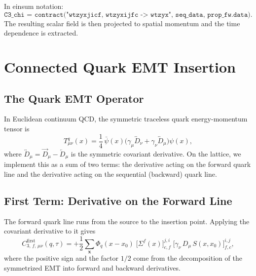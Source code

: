 \documentclass[11pt,a4paper]{article}
\newcommand{\Dmu}{D_{\mu}}
\newcommand{\TmunuQ}{T_{\mu\nu}^{q}}
\newcommand{\seqprop}{\Sigma}
\newcommand{\fwprop}{S}
\newcommand{\xsrc}{x_{0}}
\newcommand{\xins}{x}
\newcommand{\momtrans}{q}
\begin{document}
In einsum notation:
\begin{equation}
  \texttt{C3\_chi = contract("wtzyxjicf, wtzyxijfc -> wtzyx", seq\_data, prop\_fw.data)}.
\end{equation}
The resulting scalar field is then projected to spatial momentum and the time
dependence is extracted.

\section{Connected Quark EMT Insertion}

\subsection{The Quark EMT Operator}

In Euclidean continuum QCD, the symmetric traceless quark energy-momentum tensor is
\begin{equation}
  \TmunuQ(x) = \frac{1}{4}\,
    \bar{\psi}(x)\Big(
      \gamma_{\mu}\overleftrightarrow{D}_{\nu}
      + \gamma_{\nu}\overleftrightarrow{D}_{\mu}
    \Big)\psi(x),
\end{equation}
where $\overleftrightarrow{D}_{\mu} = \overrightarrow{D}_{\mu} -
\overleftarrow{D}_{\mu}$ is the symmetric covariant derivative.  On the lattice, we
implement this as a sum of two terms: the derivative acting on the forward quark
line and the derivative acting on the sequential (backward) quark line.

\subsection{First Term: Derivative on the Forward Line}

The forward quark line runs from the source to the insertion point.  Applying the
covariant derivative to it gives
\begin{equation}
  \boxed{
  C_{3,\,f,\,\mu\nu}^{\text{first}}(\momtrans,\tau)
  = +\frac{1}{2}\sum_{\mathbf{x}}
    \Phi_{\momtrans}(\xins-\xsrc)\;
    \big[\seqprop^{f}(x)\big]^{j,i}_{c,f}\;
    \big[\gamma_{\nu}\,\Dmu\,\fwprop(x,\xsrc)\big]^{i,j}_{f,c},
  }
  \label{eq:C3_first}
\end{equation}
where the positive sign and the factor $1/2$ come from the decomposition of the
symmetrized EMT into forward and backward derivatives.
\end{document}
